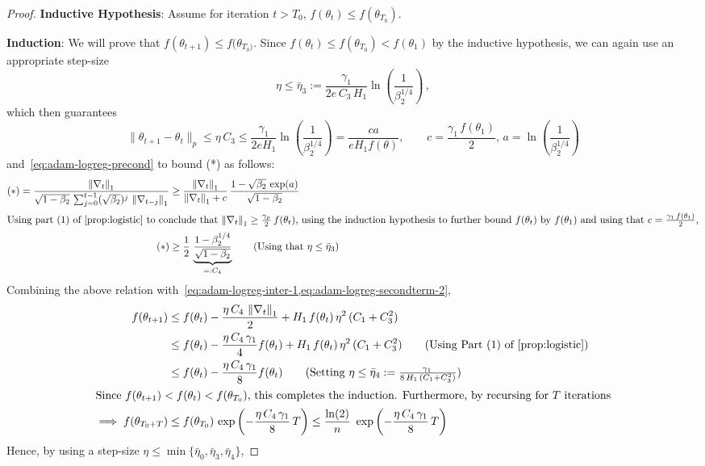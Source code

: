 \documentclass{article}
\newcommand{\norm}[1]{\left\|#1 \right\|}
\newcommand{\tht}{\theta_t}
\newcommand{\thtt}{\theta_{t+1}}
\begin{document}
\begin{proof}
\textbf{Inductive Hypothesis}: Assume for iteration $t > T_0$, $f(\tht) \leq f(\theta_{T_0})$.

\textbf{Induction}: We will prove that $f(\thtt) \leq f(\theta_{T_0)}$. Since $f(\tht) \leq f(\theta_{T_0}) < f(\theta_1)$ by the inductive hypothesis, we can again use an appropriate step-size 
\[
\eta \leq \bar{\eta}_3 :=  \frac{\gamma_1}{2e \, C_3 \, H_1}\ln\left(\frac{1}{\beta_2^{1/4}}\right)\,,
\]
which then guarantees
\[
\|\theta_{t+1} - \tht\|_p \leq \eta\, C_3 \leq \frac{\gamma_1 }{2e H_1 }\ln\left(\frac{1}{\beta_2^{1/4}}\right) = \frac{ca}{eH_1f(\theta)}, \qquad c  = \frac{\gamma_1 \, f(\theta_1)}{2}, \, a = \ln\left(\frac{1}{\beta_2^{1/4}}\right)
\]
and~\cref{eq:adam-logreg-precond} to bound (*) as follows:
\begin{align*}
(*) = \frac{\norm{\nabla_t}_1}{\sqrt{1 - \beta_2} \, \sum_{j = 0}^{t-1} (\sqrt{\beta_2})^{j} \, \norm{\nabla_{t-j}}_1} & \geq \frac{\norm{\nabla_t}_1}{\norm{\nabla_t}_1 + c} \, \frac{1 - \sqrt{\beta_2} \, \exp(a)}{\sqrt{1 - \beta_2}} \\
\intertext{Using part (1) of~\cref{prop:logistic} to conclude that $\norm{\nabla_t}_1 \geq \frac{\gamma_p}{2} \, f(\tht)$, using the induction hypothesis to further bound $f(\tht)$ by $f(\theta_1)$ and using that $c = \frac{\gamma_1 \, f(\theta_1)}{2}$,}
(*) & \geq \frac{1}{2} \, \underbrace{\frac{1 - \beta_2^{1/4}}{\sqrt{1 - \beta_2}}}_{=:C_4}   \tag{Using that $\eta \leq \bar{\eta}_3$}
\end{align*}
Combining the above relation with~\cref{eq:adam-logreg-inter-1,eq:adam-logreg-secondterm-2},
\begin{align*}
f(\thtt) & \leq f(\tht) - \frac{\eta \,C_4\, \norm{\nabla_t}_1}{2} + H_1 \, f(\tht) \, \eta^2\, (C_1+ C^2_3) \\
& \leq f(\tht) - \frac{\eta \, C_4\,\gamma_1}{4} f(\tht) + H_1 \, f(\tht) \, \eta^2\, (C_1+ C^2_3)\tag{Using Part (1) of~\cref{prop:logistic}} \\
& \leq f(\tht) - \frac{\eta \, C_4\,\gamma_1}{8} f(\tht) \tag{Setting $\eta \leq \bar{\eta}_4 := \frac{\gamma_1 \,}{8 \, H_1  \, (C_1+C^2_3)} $} \\
\intertext{Since $f(\thtt) < f(\tht) < f(\theta_{T_0})$, this completes the induction. Furthermore, by recursing for $T$ iterations}
\implies f(\theta_{T_0 + T}) & \leq f(\theta_{T_0}) \, \exp\left(-\frac{\eta \, C_4\,\gamma_1}{8} \, T \right) \leq \frac{\ln(2)}{n} \, \, \exp\left(-\frac{\eta \,C_4\, \gamma_1}{8} \, T \right) 
\end{align*}
Hence, by using a step-size $\eta \leq \min\{\bar{\eta}_0, \bar{\eta}_3, \bar{\eta}_4\}$, 

\end{proof}
\end{document}
